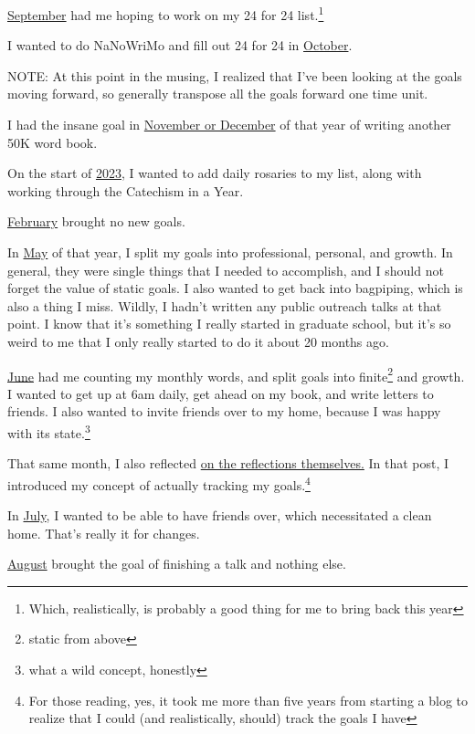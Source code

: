 \documentclass[12pt]{article}[titlepage]
\renewcommand{\,}{\textsuperscript{,}}
\begin{document}
\href{reflection-september-2022}{September} had me hoping to work on my 24 for 24 list.\footnote{Which, realistically, is probably a good thing for me to bring back this year}

I wanted to do NaNoWriMo and fill out 24 for 24 in \href{reflection-october-24}{October}.

NOTE: At this point in the musing, I realized that I've been looking at the goals moving forward, so generally transpose all the goals forward one time unit.

I had the insane goal in \href{reflection-november-24}{November or December} of that year of writing another 50K word book.

On the start of \href{reflection-2022}{2023}, I wanted to add daily rosaries to my list, along with working through the Catechism in a Year.

\href{reflection-january-23}{February} brought no new goals.

In \href{reflection-april-23}{May} of that year, I split my goals into professional, personal, and growth.  
In general, they were single things that I needed to accomplish, and I should not forget the value of static goals.  
I also wanted to get back into bagpiping, which is also a thing I miss.  
Wildly, I hadn't written any public outreach talks at that point.  
I know that it's something I really started in graduate school, but it's so weird to me that I only really started to do it about 20 months ago.

\href{reflection-may-23}{June} had me counting my monthly words, and split goals into finite\footnote{static from above} and growth.  
I wanted to get up at 6am daily, get ahead on my book, and write letters to friends.  
I also wanted to invite friends over to my home, because I was happy with its state.\footnote{what a wild concept, honestly}

That same month, I also reflected \href{reflection-monthly-reflection}{on the reflections themselves.}  
In that post, I introduced my concept of actually tracking my goals.\footnote{For those reading, yes, it took me more than five years from starting a blog to realize that I could (and realistically, should) track the goals I have}

In \href{reflection-june-23}{July}, I wanted to be able to have friends over, which necessitated a clean home.  
That's really it for changes.

\href{reflection-july-23}{August} brought the goal of finishing a talk and nothing else.  
\end{document}
